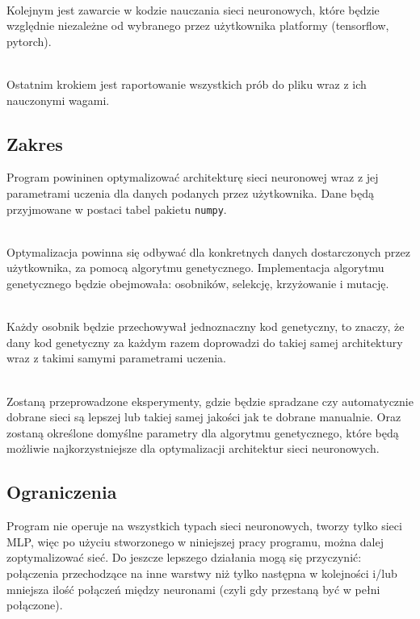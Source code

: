 \noindent\\
Kolejnym jest zawarcie w kodzie nauczania
sieci neuronowych, które będzie względnie niezależne
od wybranego przez użytkownika platformy
(tensorflow, pytorch).

\noindent\\
Ostatnim krokiem jest raportowanie wszystkich
prób do pliku wraz z ich nauczonymi wagami.

\subsection*{Zakres}
Program powininen optymalizować
architekturę sieci neuronowej
wraz z jej parametrami uczenia
dla danych podanych przez użytkownika.
Dane będą przyjmowane w postaci
tabel pakietu \texttt{numpy}.


\noindent\\
Optymalizacja powinna się odbywać dla konkretnych
danych dostarczonych przez użytkownika,
za pomocą algorytmu genetycznego.
Implementacja algorytmu genetycznego będzie obejmowała:
osobników, selekcję, krzyżowanie i mutację.

\noindent\\
Każdy osobnik będzie przechowywał
jednoznaczny kod genetyczny, to znaczy,
że dany kod genetyczny za każdym razem
doprowadzi do takiej samej architektury
wraz z takimi samymi parametrami uczenia.

\noindent\\
Zostaną przeprowadzone eksperymenty,
gdzie będzie spradzane
czy automatycznie dobrane sieci
są lepszej lub takiej samej jakości
jak te dobrane manualnie.
Oraz zostaną określone domyślne parametry
dla algorytmu genetycznego,
które będą możliwie najkorzystniejsze
dla optymalizacji architektur sieci neuronowych.

\subsection*{Ograniczenia}
Program nie operuje na wszystkich
typach sieci neuronowych,
tworzy tylko sieci MLP,
więc po użyciu stworzonego
w niniejszej pracy programu,
można dalej zoptymalizować sieć.
Do jeszcze lepszego działania
mogą się przyczynić:
połączenia przechodzące na inne warstwy
niż tylko następna w kolejności
i/lub mniejsza ilość połączeń między neuronami
(czyli gdy przestaną być w pełni połączone).

